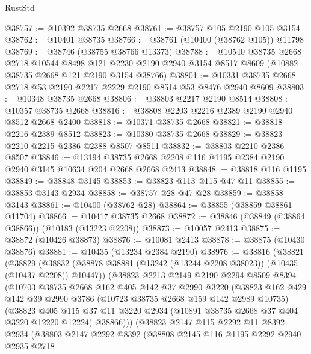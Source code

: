 \begin{lexlean}{RustStd}
\begin{coremodule}
@38757 := @10392 @38735 @2668
@38761 := @38757 @105 @2190 @105 @3154
@38762 := @10401 @38735
@38766 := @38761 (@10400 (@38762 @105)) @11798
@38769 := @38746 (@38755 @38766 @13373)
@38788 := @10540
    @38735
    @2668
    @2718
    @10544
    @8498
    @121
    @2230
    @2190
    @2940
    @3154
    @8517
    @8609
    (@10882 @38735 @2668 @121 @2190 @3154 @38766)
@38801 := @10331 @38735 @2668 @2718 @53 @2190 @2217 @2229 @2190 @8514 @53 @8476 @2940 @8609
@38803 := @10348 @38735 @2668
@38806 := @38803 @2217 @2190 @8514
@38808 := @10357 @38735 @2668
@38816 := @38808 @2203 @2216 @2389 @2190 @2940 @8512 @2668 @2400
@38818 := @10371 @38735 @2668
@38821 := @38818 @2216 @2389 @8512
@38823 := @10380 @38735 @2668
@38829 := @38823 @2210 @2215 @2386 @2388 @8507 @8511
@38832 := @38803 @2210 @2386 @8507
@38846 := @13194 @38735 @2668 @2208 @116 @1195 @2384 @2190 @2940 @3145 @10634 @204 @2668 @2668 @2413
@38848 := @38818 @116 @1195
@38849 := @38848 @3145
@38853 := @38823 @113 @115 @47 @11
@38855 := @38853 @3143 @2934
@38858 := @38757 @28 @47 @28
@38859 := @38858 @3143
@38861 := @10400 (@38762 @28)
@38864 := @38855 (@38859 @38861 @11704)
@38866 := @10417 @38735 @2668
@38872 := @38846 (@38849 (@38864 @38866)) (@10183 (@13223 @2208))
@38873 := @10057 @2413
@38875 := @38872 (@10426 @38873)
@38876 := @10081 @2413
@38878 := @38875 (@10430 @38876)
@38881 := @10435 (@13234 @2384 @2190)
@38976 := @38816
    (@38821
      (@38829
        (@38832 (@38878 @38881 (@13242 (@13244 @2208 @38023)) (@10435 (@10437 @2208)) @10447))
        (@38823
          @2213
          @2149
          @2190
          @2294
          @8509
          @8394
          (@10703
            @38735
            @2668
            @162
            @405
            @142
            @37
            @2990
            @3220
            (@38823
              @162
              @429
              @142
              @39
              @2990
              @3786
              (@10723 @38735 @2668 @159 @142 @2989 @10735)
              (@38823
                @405
                @115
                @37
                @11
                @3220
                @2934
                (@10891 @38735 @2668 @37 @404 @3220 @12220 @12224)
                @38866)))
          (@38823
            @2147
            @115
            @2292
            @11
            @8392
            @2934
            (@38803
              @2147
              @2292
              @8392
              (@38808
                @2145
                @116
                @1195
                @2292
                @2940
                @2935
                @2718

\end{coremodule}
\end{lexlean}
